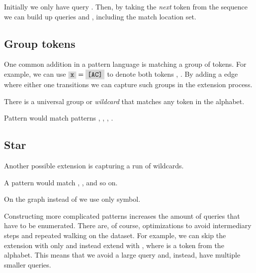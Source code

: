 \begin{figure}[H]
	
\end{figure}

Initially we only have query . Then, by taking the \emph{next} token from the sequence we can build up queries  and , including the match location set.

\subsection{Group tokens}

One common addition in a pattern language is matching a group of tokens. For example, we can use $\R{x} = \R{[AC]}$ to denote both tokens , . By adding a edge where either one transitions we can capture such groups in the extension process.

\begin{figure}[H]
	
\end{figure}

There is a universal group  or \emph{wildcard} that matches any token in the alphabet.

\begin{exmp}
Pattern  would match patterns , , , .
\end{exmp}

\subsection{Star}

Another possible extension is capturing a run of wildcards.

\begin{exmp}
A pattern  would match , ,  and so on.
\end{exmp}

On the graph instead of  we use only \R{*} symbol.

\begin{figure}[H]
	
\end{figure}

Constructing more complicated patterns increases the amount of queries that have to be enumerated. There are, of course, optimizations to avoid intermediary steps and repeated walking on the dataset. For example, we can skip the extension with only  and instead extend with , where  is a token from the alphabet. This means that we avoid a large query and, instead, have multiple smaller queries.


